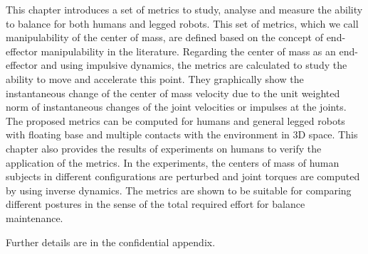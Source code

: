 
This chapter introduces a set of metrics to study, analyse and measure the
ability to balance for both humans and legged robots.  This set of metrics,
which we call manipulability of the center of mass, are defined based on the
concept of end-effector manipulability in the literature.  Regarding the
center of mass as an end-effector and using impulsive dynamics, the metrics
are calculated to study the ability to move and accelerate this point.  They
graphically show the instantaneous change of the center of mass velocity due
to the unit weighted norm of instantaneous changes of the joint velocities or
impulses at the joints.  The proposed metrics can be computed for humans and
general legged robots with floating base and multiple contacts with the
environment in 3D space.  This chapter also provides the results of
experiments on humans to verify the application of the metrics.  In the
experiments, the centers of mass of human subjects in different configurations
are perturbed and joint torques are computed by using inverse dynamics.  The
metrics are shown to be suitable for comparing different postures in the sense
of the total required effort for balance maintenance.

Further details are in the confidential appendix.




